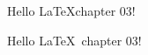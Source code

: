 \documentclass[11pt]{article}
\begin{document}
Hello \LaTeX chapter 03!

Hello \LaTeX \ chapter 03!
\end{document}
